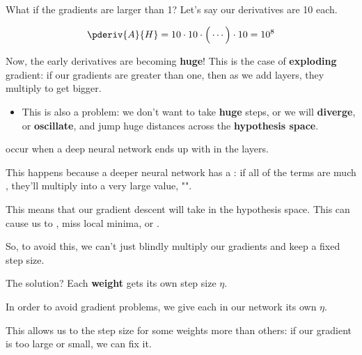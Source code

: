         What if the gradients are larger than 1? Let's say our derivatives are 10 each.
        
        \begin{equation}
            \pderiv{A}{H}
            = 
            10 \cdot 10 \cdot 
            \Big(
            \cdots
            \Big)
            \cdot 
            10
            =
            10^{8}
        \end{equation}
        
        Now, the early derivatives are becoming \textbf{huge}! This is the case of \textbf{exploding} gradient: if our gradients are greater than one, then as we add layers, they multiply to get bigger.

        \begin{itemize}
            \item This is also a problem: we don't want to take \textbf{huge} steps, or we will \textbf{diverge}, or \textbf{oscillate}, and jump huge distances across the \textbf{hypothesis space}.\\
        \end{itemize}
        
        
        
        \begin{definition}
             occur when a deep neural network ends up with  in the  layers. 
            
            This happens because a deeper neural network has a : if all of the terms are much , they'll multiply into a very large value, "".
            
            This means that our gradient descent will take  in the hypothesis space. This can cause us to , miss local minima, or .
        \end{definition}
        
        So, to avoid this, we can't just blindly multiply our gradients and keep a fixed step size.
        
        The solution? Each \textbf{weight} gets its own step size $\eta$.\\
        
        \begin{concept}
            In order to avoid  gradient problems, we give each  in our network its own  $\eta$.
            
            This allows us to  the step size for some weights more than others: if our gradient is too large or small, we can fix it.
        \end{concept}


